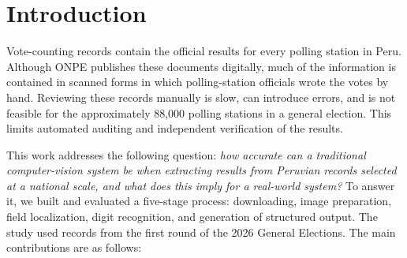 \documentclass[conference]{IEEEtran}
\begin{document}
\section{Introduction}
Vote-counting records contain the official results for every polling station in
Peru. Although ONPE publishes these documents digitally, much of the information
is contained in scanned forms in which polling-station officials wrote the votes
by hand. Reviewing these records manually is slow, can introduce errors, and is
not feasible for the approximately 88,000 polling stations in a general election.
This limits automated auditing and independent verification of the results.

This work addresses the following question: \emph{how accurate can a traditional
computer-vision system be when extracting results from Peruvian records selected
at a national scale, and what does this imply for a real-world system?} To answer
it, we built and evaluated a five-stage process: downloading, image preparation,
field localization, digit recognition, and generation of structured output. The
study used records from the first round of the 2026 General Elections. The main
contributions are as follows:
\end{document}
